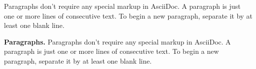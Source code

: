 Paragraphs don’t require any special markup in AsciiDoc.
A paragraph is just one or more lines of consecutive text.
To begin a new paragraph, separate it by at least one blank line.

{\bf Paragraphs.} Paragraphs don’t require any special markup in AsciiDoc.
A paragraph is just one or more lines of consecutive text.
To begin a new paragraph, separate it by at least one blank line.

